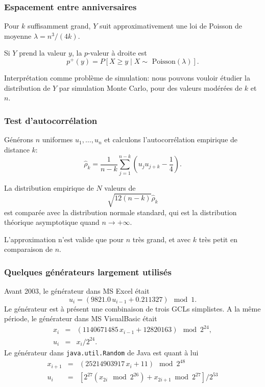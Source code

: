 \documentclass[t,usepdftitle=false]{beamer}
\begin{document}
\begin{frame}
\frametitle{Espacement entre anniversaires}

Pour $k$ suffisamment grand, $Y$ suit approximativement une loi de
Poisson de moyenne $\lambda = n^3/(4k)$.

\mbox{}

Si $Y$ prend la valeur $y$, la $p$-valeur à droite est
$$
   p^+(y) = P[X \ge y \mid X \sim \mbox{ Poisson}(\lambda)].
$$

\mbox{}

Interprétation comme problème de simulation: nous pouvons vouloir
étudier la distribution de $Y$ par simulation Monte Carlo, pour des valeurs modérées de $k$ et $n$.


\end{frame}

\begin{frame}
\frametitle{Test d'autocorrélation}

Générons $n$ uniformes $u_1,\ldots,u_n$ et calculons l'autocorrélation empirique de distance $k$:
\[
\hat{\rho}_k = \frac{1}{n-k} \sum_{j = 1}^{n-k} \left( u_ju_{j+k} - \frac{1}{4}\right).
\]

\mbox{}

La distribution empirique de $N$ valeurs de
\[\sqrt{12(n - k)}\hat{\rho}_k\]
est comparée avec la distribution normale standard,
qui est la distribution théorique asymptotique quand $n \rightarrow +\infty$.

\mbox{}

L'approximation n'est valide que pour $n$ très grand, et avec $k$ très
petit en comparaison de $n$.

\end{frame}

\begin{frame}
\frametitle{Quelques générateurs largement utilisés}

Avant 2003, le générateur dans MS Excel était
$$
   u_{i}  = (9821.0\,  u_{i-1} + 0.211327) \mod 1.
$$
Le générateur est à présent une combinaison de trois GCLs simplistes.
A la même période, le générateur dans MS VisualBasic était
\begin{eqnarray*}
  x_{i} &=& (1140671485\,  x_{i-1} + 12820163) \mod 2^{24},\\
  u_i   &=& x_i / 2^{24}. 
\end {eqnarray*}
Le générateur dans {\tt java.util.Random} de Java est quant à lui
\begin{eqnarray*}
   x_{i+1} &=& (25214903917\, x_i + 11) \mod 2^{48} \\
   u_i &=& [2^{27}\left(x_{2i} \mod 2^{26}\right) 
                    + x_{2i+1} \bmod 2^{27}] / 2^{53}
\end{eqnarray*}

\end{frame}
\end{document}
